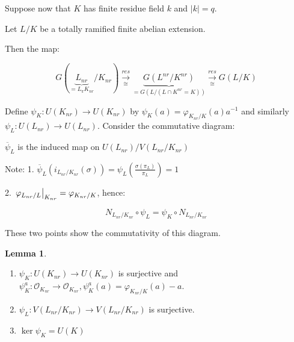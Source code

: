 \documentclass{article}
\theoremstyle{definition}
\numberwithin{theorem}{subsection}
\newtheorem{lemma}[theorem]{Lemma}
\begin{document}
    Suppose now that \(K\) has finite residue field \(k\) and \(\vert k \vert = q\).

    Let \(L / K\) be a totally ramified finite abelian extension.

    Then the map:

    \[
        G(\underbrace{L_{nr}}_{= L_\pi K_{nr}} / K_{nr}) \xrightarrow[\cong]{res} \underbrace{G(L^{nr} / K^{nr})}_{= G(L / (L\cap K^{nr} = K))} \xrightarrow[\cong]{res} G(L / K)
    \]

    Define \(\psi_K : U(K_{nr}) \to U(K_{nr})\) by \(\psi_K(a) = \varphi_{K_{nr} / K}(a) a ^{-1}\) and similarly \(\psi_L : U(L_{nr}) \to U(L_{nr})\). Consider the commutative diagram:

    \begin{center}
    \end{center}

    \(\overline{\psi}_L\) is the induced map on \(U(L_{nr}) / V(L_{nr} / K_{nr})\)  

    Note: 1. \(\overline{\psi}_L \left( i_{L_{nr} / K_{nr}} (\sigma) \right) = \psi_L \left( \frac{\sigma(\pi_L)}{\pi_L} \right) = 1\) 

    2. \(\eval{\varphi_{L_{nr} / L}}_{K_{nr}} = \varphi_{K_{nr} / K}\), hence:
    
    \[
        N_{L_{nr} / K_{nr}} \circ \psi_L = \psi_K \circ N_{L_{nr} / K_{nr}}
    \]

    These two points show the commutativity of this diagram.

    \begin{lemma}
        \begin{enumerate}[label=\roman*)]
            \item \(\psi_K : U(K_{nr}) \to U(K_{nr})\) is surjective and \(\psi_K^a: \mathcal{O}_{K_{nr}} \to \mathcal{O}_{K_{nr}}, \psi_K^a(a) = \varphi_{K_{nr} / K}(a) - a\).
            \item \(\psi_L: V(L_{nr} / K_{nr}) \to V(L_{nr} / K_{nr})\) is surjective.
            \item \(\ker \psi_K = U(K)\) 
        \end{enumerate} 
    \end{lemma}
\end{document}
